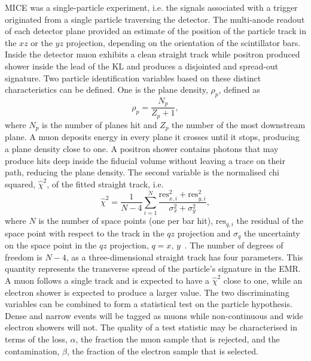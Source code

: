 MICE was a single-particle experiment, i.e. the signals associated with a trigger originated from a single particle traversing the detector. The multi-anode readout of each detector plane provided an estimate of the position of the particle track in the $xz$ or the $yz$ projection, depending on the orientation of the scintillator bars.
Inside the detector muon exhibits a clean straight track while positron produced shower inside the lead of the KL and produces a disjointed and spread-out signature. 
Two particle identification variables based on these distinct characteristics can be defined. One is the plane density, $\rho_p$, defined as
\begin{equation}
\rho_p = \frac{N_p}{Z_p+1},
\end{equation}
where $N_p$ is the number of planes hit and $Z_p$ the number of the most downstream plane. A muon deposits energy in every plane it crosses until it stops, producing a plane density close to one. A positron shower contains photons that may produce hits deep inside the fiducial volume without leaving a trace on their path, reducing the plane density. The second variable is the normalised chi squared, $\hat{\chi}^2$, of the fitted straight track, i.e.
\begin{equation}
\hat{\chi}^2=\frac{1}{N-4}\sum_{i=1}^{N}\frac{\text{res}_{x,i}^2+\text{res}_{y,i}^2}{\sigma_x^2+\sigma_y^2},
\end{equation}
where $N$ is the number of space points (one per bar hit), $\text{res}_{q,i}$ the residual of the space point with respect to the track in the $qz$ projection and $\sigma_q$ the uncertainty on the space point in the $qz$ projection, $q=x,\,y$~\cite{Drielsma:thesis}. The number of degrees of freedom is $N-4$, as a three-dimensional straight track has four parameters. This quantity represents the transverse spread of the particle's signature in the EMR. A muon follows a single track and is expected to have a $\hat{\chi}^2$ close to one, while an electron shower is expected to produce a larger value.
The two discriminating variables can be combined to form a statistical test on the particle hypothesis.
Dense and narrow events will be tagged as muons while non-continuous and wide electron showers will not. 
The quality of a test statistic may be characterised in terms of the loss, $\alpha$, the fraction the muon sample that is rejected, and the contamination, $\beta$, the fraction of the electron sample that is selected.

